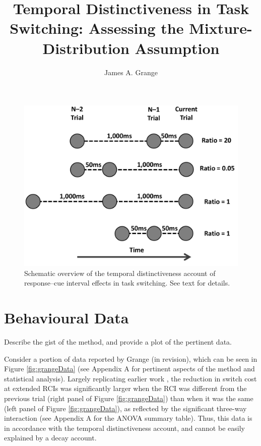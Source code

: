 \documentclass[a4paper, jou, natbib]{apa6}
\title{Temporal Distinctiveness in Task Switching: Assessing the Mixture-Distribution Assumption}
\author{James A. Grange}
\affiliation{School of Psychology, Keele University, UK}
\begin{document}
\maketitle

\begin{figure} 
\begin{center}
\includegraphics[width = 0.5 \textwidth]{Images/tdAccount.pdf}
\caption{Schematic overview of the temporal distinctiveness account of response--cue interval effects in task switching. See text for details.}
\label{fig:tdAccount}
\end{center}
\end{figure}




\section{Behavioural Data}
Describe the gist of the method, and provide a plot of the pertinent data.

Consider a portion of data reported by Grange (in revision), which can be seen in Figure \ref{fig:grangeData} (see Appendix A for pertinent aspects of the method and statistical analysis). Largely replicating earlier work \citep{Horoufchin2011, Horoufchin2011a}, the reduction in switch cost at extended RCIs was significantly larger when the RCI was different from the previous trial (right panel of Figure \ref{fig:grangeData}) than when it was the same (left panel of Figure \ref{fig:grangeData}), as reflected by the significant three-way interaction (see Appendix A for the ANOVA summary table). Thus, this data is in accordance with the temporal distinctiveness account, and cannot be easily explained by a decay account.
    
\end{document}
